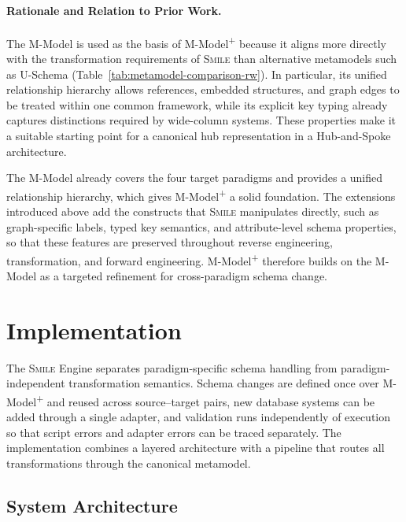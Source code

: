 \documentclass{llncs}
\begin{document}
\paragraph{Rationale and Relation to Prior Work.}
The M-Model is used as the basis of M-Model\textsuperscript{+} because it aligns more directly with the transformation requirements of \textsc{Smile} than alternative metamodels such as U-Schema (Table~\ref{tab:metamodel-comparison-rw}). In particular, its unified relationship hierarchy allows references, embedded structures, and graph edges to be treated within one common framework, while its explicit key typing already captures distinctions required by wide-column systems. These properties make it a suitable starting point for a canonical hub representation in a Hub-and-Spoke architecture.

The M-Model already covers the four target paradigms and provides a unified relationship hierarchy, which gives M-Model\textsuperscript{+} a solid foundation. The extensions introduced above add the constructs that \textsc{Smile} manipulates directly, such as graph-specific labels, typed key semantics, and attribute-level schema properties, so that these features are preserved throughout reverse engineering, transformation, and forward engineering. M-Model\textsuperscript{+} therefore builds on the M-Model as a targeted refinement for cross-paradigm schema change.

\section{Implementation}
\label{sec:implementation}

The \textsc{Smile} Engine separates paradigm-specific schema handling from paradigm-independent transformation semantics.
Schema changes are defined once over M-Model\textsuperscript{+} and reused across source--target pairs, new database systems can be added through a single adapter, and validation runs independently of execution so that script errors and adapter errors can be traced separately.
The implementation combines a layered architecture with a pipeline that routes all transformations through the canonical metamodel.

\subsection{System Architecture}
\end{document}
